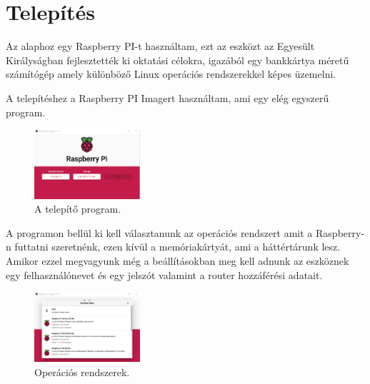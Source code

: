 \documentclass[a4paper,12pt,oneside]{report}
\begin{document}





\chapter{Telepítés}

Az alaphoz egy Raspberry PI-t használtam, ezt az eszközt az Egyesült Királyságban fejlesztették ki oktatási célokra, igazából
egy bankkártya méretű számítógép amely különböző Linux operációs rendszerekkel képes üzemelni.

A telepítéshez a Raspberry PI Imagert használtam, ami egy elég egyszerű program.

\begin{figure}[htbp]
	\centering
	\includegraphics[width=0.35\textwidth]{fig/Imager.png}
	\caption{A telepítő program.}
	\label{fig-Imager}
\end{figure}

A programon bellül ki kell választanunk az operációs rendszert amit a Raspberry-n futtatni szeretnénk, ezen kívül a memóriakártyát, 
ami a háttértárunk lesz. Amikor ezzel megvagyunk még a beállításokban meg kell adnunk az eszköznek egy felhasználónevet és egy jelszót
valamint a router hozzáférési adatait.

\begin{figure}[htbp]
	\centering
	\includegraphics[width=0.35\textwidth]{fig/os.png}
	\caption{Operációs rendszerek.}
	\label{fig-os}
\end{figure}
\end{document}
